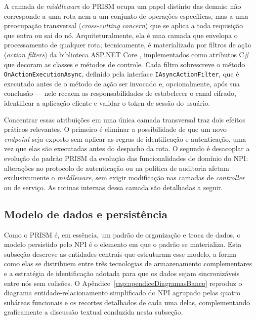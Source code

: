 A camada de \textit{middleware} do PRISM ocupa um papel distinto das demais: não corresponde a uma rota nem a um conjunto de operações específicas, mas a uma preocupação transversal (\textit{cross-cutting concern}) que se aplica a toda requisição que entra ou sai do nó. Arquiteturalmente, ela é uma camada que envelopa o processamento de qualquer rota; tecnicamente, é materializada por filtros de ação (\textit{action filters}) da biblioteca ASP.NET Core \cite{aspnetcoreDocs}, implementados como atributos C\# que decoram as classes e métodos de controle. Cada filtro sobrescreve o método \texttt{OnActionExecutionAsync}, definido pela interface \texttt{IAsyncActionFilter}, que é executado antes de o método de ação ser invocado e, opcionalmente, após sua conclusão --- nele recaem as responsabilidades de estabelecer o canal cifrado, identificar a aplicação cliente e validar o token de sessão do usuário. 

Concentrar essas atribuições em uma única camada transversal traz dois efeitos práticos relevantes. O primeiro é eliminar a possibilidade de que um novo \textit{endpoint} seja exposto sem aplicar as regras de identificação e autenticação, uma vez que elas são executadas antes do despacho da rota. O segundo é desacoplar a evolução do padrão PRISM da evolução das funcionalidades de domínio do NPI: alterações no protocolo de autenticação ou na política de auditoria afetam exclusivamente o \textit{middleware}, sem exigir modificação nas camadas de \textit{controller} ou de serviço. As rotinas internas dessa camada são detalhadas a seguir.%

\subsection{Modelo de dados e persistência}\label{subsec:NPIDados}

Como o PRISM é, em essência, um padrão de organização e troca de dados, o modelo persistido pelo NPI é o elemento em que o padrão se materializa. Esta subseção descreve as entidades centrais que estruturam esse modelo, a forma como elas se distribuem entre três tecnologias de armazenamento complementares e a estratégia de identificação adotada para que os dados sejam sincronizáveis entre nós sem colisões. O Apêndice~\ref{cap:apendiceDiagramasBanco} reproduz o diagrama entidade-relacionamento simplificado do NPI agrupado pelas quatro subáreas funcionais e os recortes detalhados de cada uma delas, complementando graficamente a discussão textual conduzida nesta subseção.

